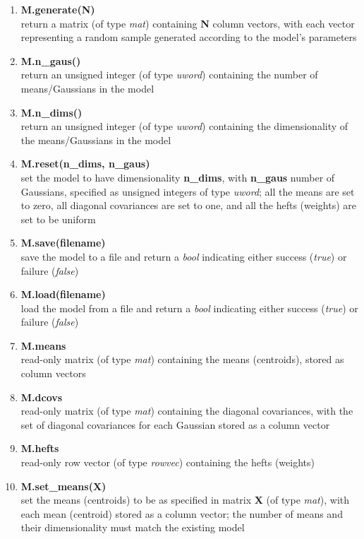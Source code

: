 \documentclass[10pt,a4paper]{article}
\begin{document}
\begin{small}
\begin{enumerate}[{$\bullet$}]
\item
{\bf M.generate(N)}\\
return a matrix (of type {\it mat}) containing {\bf N} column vectors, with each vector representing a random sample generated according to the model's parameters

\item
{\bf M.n\_gaus()}\\
return an unsigned integer (of type {\it uword}) containing the number of means/Gaussians in the model

\item
{\bf M.n\_dims()}\\
return an unsigned integer (of type {\it uword}) containing the dimensionality of the means/Gaussians in the model

\item
{\bf M.reset(n\_dims, n\_gaus)}\\
set the model to have dimensionality {\bf n\_dims}, with {\bf n\_gaus} number of Gaussians, specified as unsigned integers of type {\it uword};
all the means are set to zero, all diagonal covariances are set to one, and all the hefts (weights) are set to be uniform

\item
{\bf M.save(filename)}\\
save the model to a file and return a {\it bool} indicating either success ({\it true}) or failure ({\it false})

\item
{\bf M.load(filename)}\\
load the model from a file and return a {\it bool} indicating either success ({\it true}) or failure ({\it false})

\item
{\bf M.means}\\
read-only matrix (of type {\it mat}) containing the means (centroids), stored as column vectors

\item
{\bf M.dcovs}\\
read-only matrix (of type {\it mat}) containing the diagonal covariances, with the set of diagonal covariances for each Gaussian stored as a column vector

\item
{\bf M.hefts}\\
read-only row vector (of type {\it rowvec}) containing the hefts (weights)

\item
{\bf M.set\_means(X)}\\
set the means (centroids) to be as specified in matrix {\bf X} (of type {\it mat}), with each mean (centroid) stored as a column vector;
the number of means and their dimensionality must match the existing model


\end{enumerate}
\end{small}
\end{document}
